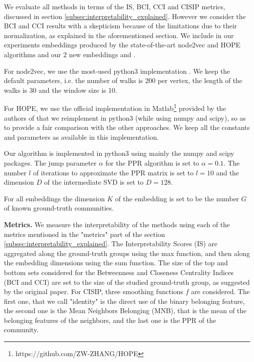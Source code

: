 We evaluate all methods in terms of the IS, BCI, CCI and CISIP metrics, discussed in section \ref{subsec:interpretability_explained}. However we consider the BCI and CCI results with a skepticism because of the limitations due to their normalization, as explained in the aforementioned section.
We include in our experiments embeddings produced by the state-of-the-art node2vec and HOPE algorithms and our 2 new embeddings \newembLeft and \newembRight.

For node2vec, we use the most-used python3 implementation \cite{node2vec_impl}. We keep the default parameters, i.e. the number of walks is 200 per vertex, the length of the walks is 30 and the window size is 10.

For HOPE, we use the official implementation in Matlab\footnote{https://github.com/ZW-ZHANG/HOPE} provided by the authors of \cite{HOPE} that we reimplement in python3 (while using numpy and scipy), so as to provide a fair comparison with the other approaches. We keep all the constants and parameters as available in this implementation.

Our algorithm is implemented in python3 using mainly the numpy \cite{numpy} and scipy \cite{scipy} packages. The jump parameter $\alpha$ for the PPR algorithm is set to $\alpha=0.1$. The number $l$ of iterations to approximate the PPR matrix is set to $l=10$ and the dimension $D$ of the intermediate SVD is set to $D=128$.

For all embeddings %
the dimension $K$ of the embedding is set to be the number $G$ of known ground-truth communities.

\noindent\textbf{Metrics.} We measure the interpretability of the methods using each of the metrics mentioned in the "metrics" part of the section \ref{subsec:interpretability_explained}. The Interpretability Scores (IS) are aggregated along the ground-truth groups using the max function, and then along the embedding dimensions using the sum function.
The size of the top and bottom sets considered for the Betweenness and Closeness Centrality Indices (BCI and CCI) are set to the size of the studied ground-truth group, as suggested by the original paper.
For CISIP, three smoothing functions $f$ are considered. The first one, that we call "identity" is the direct use of the binary belonging feature, the second one is the Mean Neighbors Belonging (MNB), that is the mean of the belonging features of the neighbors, and the last one is the PPR of the community.

